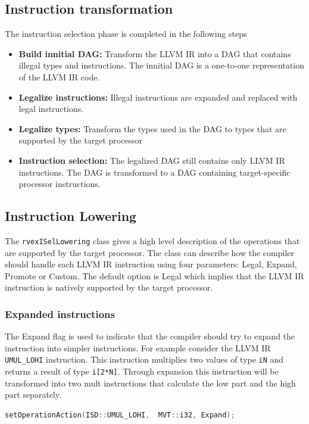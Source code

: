 \subsection{Instruction transformation}
The instruction selection phase is completed in the following steps
\begin{itemize}
  \item \textbf{Build innitial DAG:} Transform the LLVM IR into a DAG that contains illegal types and instructions. The innitial DAG is a one-to-one representation of the LLVM IR code.
  \item \textbf{Legalize instructions:} Illegal instructions are expanded and replaced with legal instructions.
  \item \textbf{Legalize types:} Transform the types used in the DAG to types that are supported by the target processor 
  \item \textbf{Instruction selection:} The legalized DAG still contains only LLVM IR instructions. The DAG is transformed to a DAG containing target-specific processor instructions.
\end{itemize}

\subsection{Instruction Lowering}
The \texttt{rvexISelLowering} class gives a high level description of the operations that are supported by the target processor. The class can describe how the compiler should handle each LLVM IR instruction using four parameters: Legal, Expand, Promote or Custom. The default option is Legal which implies that the LLVM IR instruction is natively supported by the target processor.

\subsubsection{Expanded instructions}
The Expand flag is used to indicate that the compiler should try to expand the instruction into simpler instructions. 
For example consider the LLVM IR \texttt{UMUL\_LOHI} instruction. This instruction multiplies two values of type \texttt{iN} and returns a result of type \texttt{i[2*N]}. Through expansion this instruction will be transformed into two mult instructions that calculate the low part and the high part separately.

\begin{lstlisting}[language=c] 
setOperationAction(ISD::UMUL_LOHI,  MVT::i32, Expand);
\end{lstlisting}

